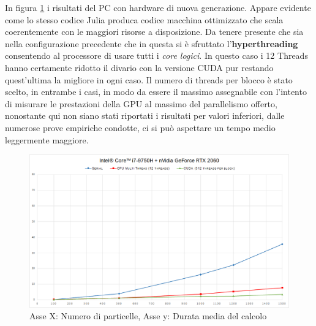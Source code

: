 \documentclass[11pt, a4paper]{article}
\begin{document}
In figura \ref{romeo} i risultati del PC con hardware di nuova generazione. Appare evidente come lo stesso codice Julia produca codice macchina ottimizzato che scala coerentemente con le maggiori risorse a disposizione. Da tenere presente che sia nella configurazione precedente che in questa si è sfruttato l'\textbf{hyperthreading} consentendo al processore di usare tutti i \emph{core logici}. In questo caso i 12 Threads hanno certamente ridotto il divario con la versione CUDA pur restando quest'ultima la migliore in ogni caso.
Il numero di threads per blocco è stato scelto, in entrambe i casi, in modo da essere il massimo assegnabile con l'intento di misurare le prestazioni della GPU al massimo del parallelismo offerto, nonostante qui non siano stati riportati i risultati per valori inferiori, dalle numerose prove empiriche condotte, ci si può aspettare un tempo medio leggermente maggiore. 
\begin{figure}[ht]
\centering
\includegraphics[width=\textwidth]{images/romeoBenchmark.png}
\caption{Asse X: Numero di particelle, Asse y: Durata media del calcolo}
\label{romeo}
\end{figure}

\end{document}
